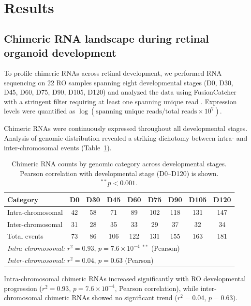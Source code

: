 \documentclass[11pt]{article}
\begin{document}
\section{Results}

\subsection{Chimeric RNA landscape during retinal organoid development}

To profile chimeric RNAs across retinal development, we performed RNA sequencing on 22 RO samples spanning eight developmental stages (D0, D30, D45, D60, D75, D90, D105, D120) and analyzed the data using FusionCatcher with a stringent filter requiring at least one spanning unique read \citep{nicorici2014fusioncatcher}. Expression levels were quantified as $\log(\text{spanning unique reads} / \text{total reads} \times 10^{7})$.

Chimeric RNAs were continuously expressed throughout all developmental stages. Analysis of genomic distribution revealed a striking dichotomy between intra- and inter-chromosomal events (Table~\ref{tab:chimeric_landscape}).

\begin{table}[H]
\centering
\caption{Chimeric RNA counts by genomic category across developmental stages. Pearson correlation with developmental stage (D0--D120) is shown. $^{**}p < 0.001$.}
\label{tab:chimeric_landscape}
\begin{tabular}{lcccccccc}
\toprule
\textbf{Category} & \textbf{D0} & \textbf{D30} & \textbf{D45} & \textbf{D60} & \textbf{D75} & \textbf{D90} & \textbf{D105} & \textbf{D120} \\
\midrule
Intra-chromosomal & 42 & 58 & 71 & 89 & 102 & 118 & 131 & 147 \\
Inter-chromosomal & 31 & 28 & 35 & 33 & 29 & 37 & 32 & 34 \\
Total events & 73 & 86 & 106 & 122 & 131 & 155 & 163 & 181 \\
\midrule
\multicolumn{9}{l}{\textit{Intra-chromosomal:} $r^{2} = 0.93$, $p = 7.6 \times 10^{-4}$ $^{**}$ (Pearson)} \\
\multicolumn{9}{l}{\textit{Inter-chromosomal:} $r^{2} = 0.04$, $p = 0.63$ (Pearson)} \\
\bottomrule
\end{tabular}
\end{table}

Intra-chromosomal chimeric RNAs increased significantly with RO developmental progression ($r^{2} = 0.93$, $p = 7.6 \times 10^{-4}$, Pearson correlation), while inter-chromosomal chimeric RNAs showed no significant trend ($r^{2} = 0.04$, $p = 0.63$).
\end{document}
